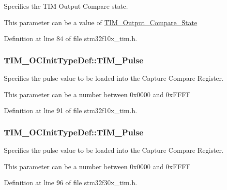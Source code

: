 \begin{DoxyVerb}   Specifies the TIM Output Compare state.
\end{DoxyVerb}
 This parameter can be a value of \hyperlink{group___t_i_m___output___compare___state}{T\-I\-M\-\_\-\-Output\-\_\-\-Compare\-\_\-\-State} 

Definition at line 84 of file stm32f10x\-\_\-tim.\-h.

\hypertarget{struct_t_i_m___o_c_init_type_def_ab4a2620c38029b136be560041173375d}{
\subsubsection[{T\-I\-M\-\_\-\-Pulse}]{ T\-I\-M\-\_\-\-O\-C\-Init\-Type\-Def\-::\-T\-I\-M\-\_\-\-Pulse}}\label{struct_t_i_m___o_c_init_type_def_ab4a2620c38029b136be560041173375d}
\begin{DoxyVerb}         Specifies the pulse value to be loaded into the Capture Compare Register. 
\end{DoxyVerb}
 This parameter can be a number between 0x0000 and 0x\-F\-F\-F\-F 

Definition at line 91 of file stm32f10x\-\_\-tim.\-h.

\hypertarget{struct_t_i_m___o_c_init_type_def_ab4a2620c38029b136be560041173375d}{
\subsubsection[{T\-I\-M\-\_\-\-Pulse}]{ T\-I\-M\-\_\-\-O\-C\-Init\-Type\-Def\-::\-T\-I\-M\-\_\-\-Pulse}}\label{struct_t_i_m___o_c_init_type_def_ab4a2620c38029b136be560041173375d}
\begin{DoxyVerb}         Specifies the pulse value to be loaded into the Capture Compare Register. 
\end{DoxyVerb}
 This parameter can be a number between 0x0000 and 0x\-F\-F\-F\-F 

Definition at line 96 of file stm32f30x\-\_\-tim.\-h.



